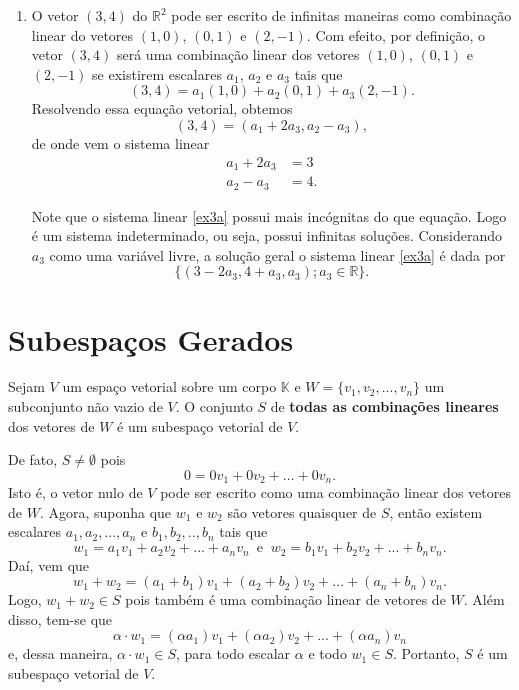 \begin{enumerate}
\item  O vetor $(3,4)$ do  $\mathbb{R}^2$ pode ser escrito de infinitas maneiras como combinação linear do vetores $(1,0)$, $(0,1)$ e $(2,-1)$. Com efeito, por  definição, o vetor  $(3,4)$ será uma combinação linear dos vetores $(1,0)$, $(0,1)$ e $(2,-1)$ se existirem  escalares $a_1$, $a_2$ e $a_3$ tais que $$(3,4)=a_1(1,0)+ a_2(0,1)+a_3(2,-1).$$ Resolvendo essa equação vetorial, obtemos $$(3,4)=(a_1+2a_3, a_2-a_3),$$  de onde vem   o sistema linear
\begin{align} a_1+2a_3&=3 \nonumber  \\ a_2-a_3&=4. \label{ex3a}\end{align}

Note que o sistema linear \eqref{ex3a} possui mais incógnitas do que equação. Logo  é um sistema indeterminado, ou seja, possui infinitas soluções. Considerando $a_3$ como uma variável livre, a solução geral o sistema linear \eqref{ex3a} é dada por $$\{ ( 3-2a_3, 4+a_3, a_3); a_3 \in \mathbb{R}\}.$$




\end{enumerate}



\section{Subespaços Gerados}

Sejam $V$ um espaço vetorial sobre um corpo  $\mathbb{K}$ e $W=\{v_1, v_2,..., v_n\}$ um subconjunto não vazio de $V$. O conjunto $S$ de \textbf{todas as combinações lineares} dos vetores de $W$ é um subespaço vetorial de $V$.

De fato, $S\neq \emptyset $ pois $$0=0v_1+0v_2+...+0v_n.$$  Isto é, o vetor nulo de $V$ pode ser escrito como uma combinação linear dos vetores de $W$. Agora,  suponha que $w_1$ e $w_2$ são vetores quaisquer de $S$, então existem escalares $a_1, a_2,...,a_n$ e $b_1, b_2,..,b_n$ tais que $$w_1=a_1v_1+ a_2v_2+...+a_nv_n \; \:\text{e} \; \;  w_2=b_1v_1+ b_2v_2+...+b_nv_n.$$ Daí, vem que $$ w_1+w_2=(a_1+b_1)v_1+ (a_2+b_2)v_2+...+(a_n+b_n)v_n .$$ Logo, $w_1+w_2 \in S$ pois também é uma combinação linear de vetores de $W$. Além disso, tem-se que $$\alpha \cdot w_1=(\alpha a_1)v_1+ (\alpha a_2)v_2+...+(\alpha a_n)v_n $$ e, dessa maneira, $\alpha \cdot w_1 \in S$, para todo escalar $\alpha$ e todo $w_1 \in S$. Portanto, $S$ é um subespaço vetorial de $V$.


